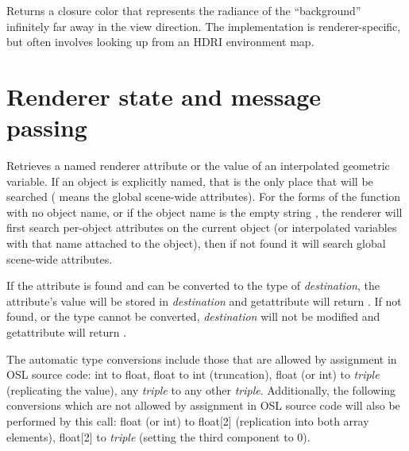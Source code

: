 \documentclass[11pt,letterpaper]{book}
\def\colorclosure{{\cf closure color}\xspace}
\begin{document}
\apiitem{\colorclosure\ {\ce background} ( )}
Returns a \colorclosure that represents the radiance of the
``background'' infinitely far away in the view direction.  The
implementation is renderer-specific, but often involves looking
up from an HDRI environment map.
\apiend


\newpage
\section{Renderer state and message passing}
\label{sec:stdlib:state}

Retrieves a named renderer attribute or the value of an interpolated
geometric variable.
If an object is explicitly named, that is the only place that will be
searched ( means the global scene-wide attributes).  For the
forms of the function with no object name, or if the object name is the
empty string \qkw{}, the renderer will first search
per-object attributes on the current object (or interpolated variables
with that name attached to the object), then if not found it will search
global scene-wide attributes.

If the attribute is found and can be converted to the type of
\emph{destination}, the attribute's value will be stored in
\emph{destination} and {\cf getattribute} will return {}.  If not
found, or the type cannot be converted, \emph{destination} will not be
modified and {\cf getattribute} will return {}.

The automatic type conversions include those that are allowed by
assignment in OSL source code: {\cf int} to {\cf float}, {\cf float} to
{\cf int} (truncation), {\cf float} (or {\cf int}) to \emph{triple}
(replicating the value), any \emph{triple} to any other \emph{triple}.
Additionally, the following conversions which are not allowed by
assignment in OSL source code will also be performed by this call: 
{\cf float} (or {\cf int}) to {\cf float[2]} (replication into both
array elements), {\cf float[2]} to \emph{triple} (setting the third
component to 0).
\end{document}
